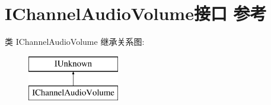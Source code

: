 \hypertarget{interface_i_channel_audio_volume}{}\section{I\+Channel\+Audio\+Volume接口 参考}
\label{interface_i_channel_audio_volume}
类 I\+Channel\+Audio\+Volume 继承关系图\+:\begin{figure}[H]
\begin{center}
\leavevmode
\includegraphics[height=2.000000cm]{interface_i_channel_audio_volume}
\end{center}
\end{figure}
